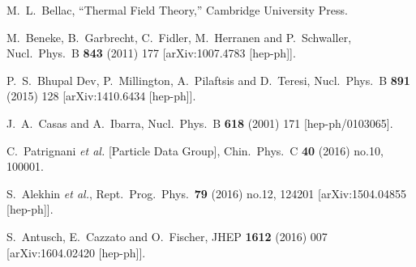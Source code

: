 \documentclass[prd,twocolumn,superscriptaddress,preprintnumbers,nofootinbib,
noshowpacs,groupedaddress]{revtex4-1} %
\begin{document}
\begin{thebibliography}{99}
  M.~L.~Bellac,
 ``Thermal Field Theory,'' Cambridge University Press.

  M.~Beneke, B.~Garbrecht, C.~Fidler, M.~Herranen and P.~Schwaller,
  Nucl.\ Phys.\ B {\bf 843} (2011) 177
  [arXiv:1007.4783 [hep-ph]].
  
  P.~S.~Bhupal Dev, P.~Millington, A.~Pilaftsis and D.~Teresi,
  Nucl.\ Phys.\ B {\bf 891} (2015) 128
  [arXiv:1410.6434 [hep-ph]].

  J.~A.~Casas and A.~Ibarra,
  Nucl.\ Phys.\ B {\bf 618} (2001) 171
  [hep-ph/0103065].

  C.~Patrignani {\it et al.} [Particle Data Group],
  Chin.\ Phys.\ C {\bf 40} (2016) no.10,  100001.

  S.~Alekhin {\it et al.},
  Rept.\ Prog.\ Phys.\  {\bf 79} (2016) no.12,  124201
  [arXiv:1504.04855 [hep-ph]].
  
  S.~Antusch, E.~Cazzato and O.~Fischer,
  JHEP {\bf 1612} (2016) 007
  [arXiv:1604.02420 [hep-ph]].
  

\end{thebibliography} 
\end{document}
